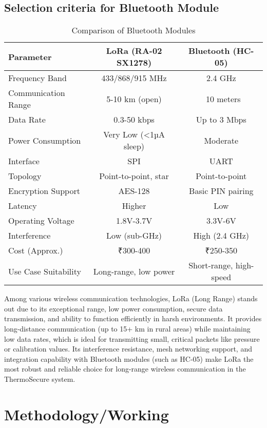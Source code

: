 \documentclass[12pt]{report}
\begin{document}
\subsection{Selection criteria for Bluetooth Module}
\begin{table}[ht]
    \centering
    \caption{Comparison of Bluetooth Modules}
    \label{tab:bluetooth_comparison}
    \begin{tabular}{lcc}
        \toprule
        Parameter & LoRa (RA-02 SX1278) & Bluetooth (HC-05) \\
        \midrule
        Frequency Band & 433/868/915 MHz & 2.4 GHz \\
        Communication Range & 5-10 km (open) & ~10 meters \\
        Data Rate & 0.3-50 kbps & Up to 3 Mbps \\
        Power Consumption & Very Low (<1µA sleep) & Moderate \\
        Interface & SPI & UART \\
        Topology & Point-to-point, star & Point-to-point \\
        Encryption Support & AES-128 & Basic PIN pairing \\
        Latency & Higher & Low \\
        Operating Voltage & 1.8V-3.7V & 3.3V-6V \\
        Interference & Low (sub-GHz) & High (2.4 GHz) \\
        Cost (Approx.) & ₹300-400 & ₹250-350 \\
        Use Case Suitability & Long-range, low power & Short-range, high-speed \\
        \bottomrule
    \end{tabular}
\end{table}

Among various wireless communication technologies, LoRa (Long Range) stands out due to its exceptional range, low power consumption, secure data transmission, and ability to function efficiently in harsh environments. It provides long-distance communication (up to 15+ km in rural areas) while maintaining low data rates, which is ideal for transmitting small, critical packets like pressure or calibration values. Its interference resistance, mesh networking support, and integration capability with Bluetooth modules (such as HC-05) make LoRa the most robust and reliable choice for long-range wireless communication in the ThermoSecure system.

\section{Methodology/Working}
\end{document}
